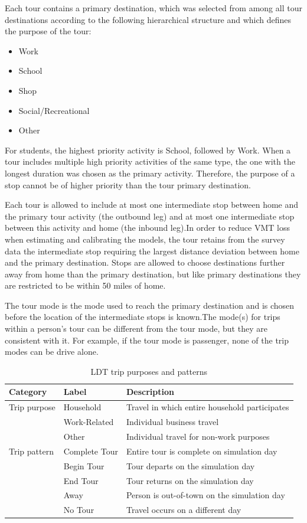 Each tour contains a primary destination, which was selected from among all tour destinations according to the following hierarchical structure and which defines the purpose of the tour:
\begin{itemize}
\item Work
\item School
\item Shop
\item Social/Recreational
\item Other
\end{itemize}

For students, the highest priority activity is School, followed by Work. When a tour includes multiple high priority activities of the same type, the one with the longest duration was chosen as the primary activity. Therefore, the purpose of a stop cannot be of higher priority than the tour primary destination.

Each tour is allowed to include at most one intermediate stop between home and the primary tour activity (the outbound leg) and at most one intermediate stop between this activity and home (the inbound leg).In order to reduce VMT loss when estimating and calibrating the models, the tour retains from the survey data the intermediate stop requiring the largest distance deviation between home and the primary destination. Stops are allowed to choose destinations further away from home than the primary destination, but like primary destinations they are restricted to be within 50 miles of home.

The tour mode is the mode used to reach the primary destination and is chosen before the location of the intermediate stops is known.The mode(s) for trips within a person's tour can be different from the tour mode, but they are consistent with it. For example, if the tour mode is passenger, none of the trip modes can be drive alone.

\begin{table}  %
\centering
\caption{LDT trip purposes and patterns}\label{tab:ldt-trip-purposes}
\begin{tabular}{lll}
\hline 
Category & Label & Description \\
\hline
Trip purpose & Household & Travel in which entire household participates \\
& Work-Related & Individual business travel \\
& Other & Individual travel for non-work purposes \\
\hline
Trip pattern & Complete Tour & Entire tour is complete on simulation day \\
& Begin Tour & Tour departs on the simulation day \\
& End Tour & Tour returns on the simulation day \\
& Away & Person is out-of-town on the simulation day \\
& No Tour & Travel occurs on a different day \\
\hline
\end{tabular}
\end{table}

